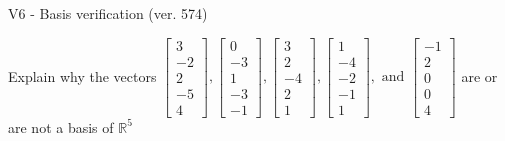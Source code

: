 \begin{exercise}
  \begin{exerciseTitle}V6 - Basis verification (ver. 574)\end{exerciseTitle}
  \begin{exerciseStatement}
    Explain why the vectors \(\left[\begin{array}{r}
3 \\
-2 \\
2 \\
-5 \\
4
\end{array}\right] , \left[\begin{array}{r}
0 \\
-3 \\
1 \\
-3 \\
-1
\end{array}\right] , \left[\begin{array}{r}
3 \\
2 \\
-4 \\
2 \\
1
\end{array}\right] , \left[\begin{array}{r}
1 \\
-4 \\
-2 \\
-1 \\
1
\end{array}\right] , \text{ and } \left[\begin{array}{r}
-1 \\
2 \\
0 \\
0 \\
4
\end{array}\right]\) are or are not a basis of \(\mathbb{R}^5\)	



\end{exerciseStatement}
\end{exercise}

